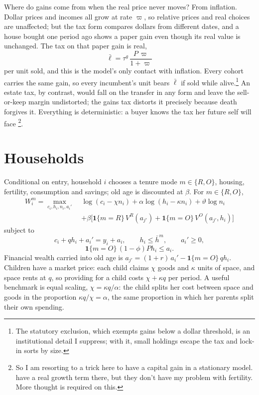\documentclass[11pt]{article}
\begin{document}
Where do gains come from when the real price never moves? From inflation. Dollar prices and incomes all grow at rate $\varpi$, so relative prices and real choices are unaffected; but the tax form compares dollars from different dates, and a house bought one period ago shows a paper gain even though its real value is unchanged. The tax on that paper gain is real,
\[
\bar\ell=\tau^g\,\frac{P\,\varpi}{1+\varpi}
\]
per unit sold, and this is the model's only contact with inflation. Every cohort carries the same gain, so every incumbent's unit bears $\bar\ell$ if sold while alive.\footnote{The statutory exclusion, which exempts gains below a dollar threshold, is an institutional detail I suppress; with it, small holdings escape the tax and lock-in sorts by size.} An estate tax, by contrast, would fall on the transfer in any form and leave the sell-or-keep margin undistorted; the gains tax distorts it precisely because death forgives it. Everything is deterministic: a buyer knows the tax her future self will face \footnote{So I am resorting to a trick here to have a capital gain in a stationary model. \citet{coven2024} have a real growth term there, but they don't have my problem with fertility. More thought is required on this.}.

\section{Households}

Conditional on entry, household $i$ chooses a tenure mode $m\in\{R,O\}$, housing, fertility, consumption and savings; old age is discounted at $\beta$. For $m\in\{R,O\}$,
\[
\begin{aligned}
W_i^m=\max_{c_i,h_i,n_i,a_i'}\;&
\log(c_i-\chi n_i)+\alpha\log(h_i-\kappa n_i)+\vartheta\log n_i\\
&+\beta\big[\mathbf 1\{m=R\}\,V^R(a_{j'})+\mathbf 1\{m=O\}\,V^O(a_{j'},h_i)\big]
\end{aligned}
\]
subject to
\[
c_i+q h_i+a_i'=y_i+a_i,
\qquad
h_i\le\bar h^m,
\qquad
a_i'\ge0,
\]
\[
\mathbf 1\{m=O\}\,(1-\phi)P h_i\le a_i .
\]
Financial wealth carried into old age is $a_{j'}=(1+r)\,a_i'-\mathbf 1\{m=O\}\,q h_i$. Children have a market price: each child claims $\chi$ goods and $\kappa$ units of space, and space rents at $q$, so providing for a child costs $\chi+\kappa q$ per period. A useful benchmark is equal scaling, $\chi=\kappa q/\alpha$: the child splits her cost between space and goods in the proportion $\kappa q/\chi=\alpha$, the same proportion in which her parents split their own spending.
\end{document}
